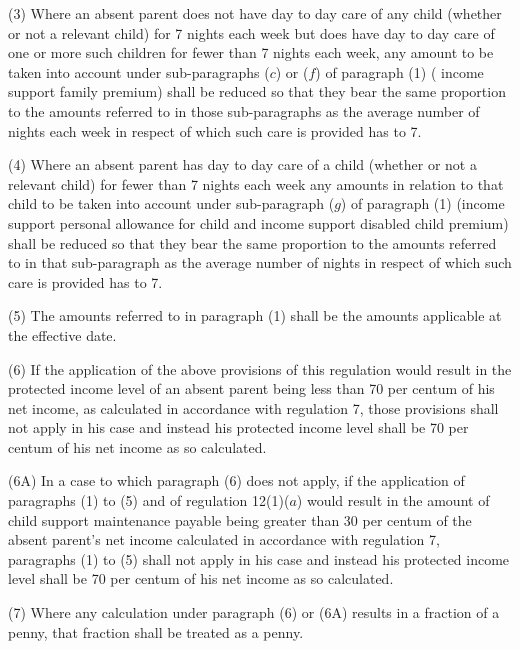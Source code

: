 \documentclass[12pt,a4paper]{article}
\begin{document}
(3) Where an absent parent does not have day to day care of any child (whether or not a relevant child) for 7 nights each week but does have day to day care of one or more such children for fewer than 7 nights each week, 
any amount  %
to be taken into account under sub-paragraphs ($c$) 
or ($f$)  %
of paragraph (1) (%
income support family premium) shall be reduced so that they bear the same proportion to the amounts referred to in those sub-paragraphs as the average number of nights each week in respect of which such care is provided has to 7.

(4) Where an absent parent has day to day care of a child (whether or not a relevant child) for fewer than 7 nights each week any amounts in relation to that child to be taken into account under sub-paragraph ($g$) of paragraph (1) (income support personal allowance for child and income support disabled child premium) shall be reduced so that they bear the same proportion to the amounts referred to in that sub-paragraph as the average number of nights in respect of which such care is provided has to 7.

(5) The amounts referred to in paragraph (1) shall be the amounts applicable at the effective date.

(6) If the application of the above provisions of this regulation would result in the protected income level of an absent parent being less than 70 per centum of his net income, as calculated in accordance with regulation 7, those provisions shall not apply in his case and instead his protected income level shall be 70 per centum of his net income as so calculated.

(6A) In a case to which paragraph (6) does not apply, if the application of paragraphs (1) to (5) and of regulation 12(1)($a$) would result in the amount of child support maintenance payable being greater than 30 per centum of the absent parent’s net income calculated in accordance with regulation 7, paragraphs (1) to (5) shall not apply in his case and instead his protected income level shall be 70 per centum of his net income as so calculated.

(7) Where any calculation under paragraph (6) 
or (6A)  %
results in a fraction of a penny, that fraction shall be treated as a penny.
\end{document}

